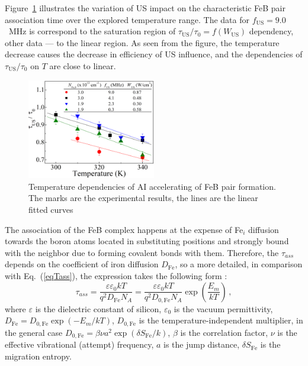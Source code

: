 \documentclass[sn-mathphys]{sn-jnl}%
\theoremstyle{thmstyleone}%
\theoremstyle{thmstyletwo}%
\theoremstyle{thmstylethree}%
\begin{document}
Figure~\ref{figTemp} illustrates the variation of US impact on 
the characteristic FeB pair association time over the explored temperature range.
The data for $f_\mathrm{US}=9.0$~MHz is correspond to the saturation region of 
$\tau_\mathrm{US}/\tau_{0}=f(W_\mathrm{US})$ dependency,
other data --- to the linear region.
As seen from the figure, the temperature decrease causes the decrease in efficiency of US influence,
and the dependencies of $\tau_\mathrm{US}/\tau_{0}$ on $T$ are close to linear.

\begin{figure}
\centering
 \includegraphics[width=0.5\textwidth]{Fig6}
\caption{
Temperature dependencies of AI accelerating of FeB pair formation.
The marks are the experimental results, the lines are the linear fitted curves
}
\label{figTemp}       %
\end{figure}

The association of the FeB complex happens at the expense of  Fe$_i$ diffusion towards the
boron atoms located in substituting positions and strongly bound with the neighbor due to forming covalent bonds with them.
Therefore, the $\tau_{ass}$ depends on the coefficient of iron diffusion $D_\mathrm{Fe}$,
so a more detailed, in comparison with Eq.~(\ref{eqTass}), the expression takes the following form \cite{FeBAssJAP2014,FeBJAP2005,FeBKin2019}:
\begin{equation}
\label{eqTass2}
\tau_{ass}=\frac{\varepsilon\varepsilon_0 kT}{q^2D_\mathrm{Fe}N_A}=
\frac{\varepsilon\varepsilon_0 kT}{q^2D_\mathrm{0,Fe}N_A}\exp\left(\frac{E_m}{kT}\right)\,,
\end{equation}
where
$\varepsilon$ is the dielectric constant of silicon,
$\varepsilon_0$ is the vacuum permittivity,
$D_\mathrm{Fe}=D_\mathrm{0,Fe}\exp(-E_m/kT)$,
$D_\mathrm{0,Fe}$ is the temperature-independent multiplier,
in the general case \cite{AZIZ2001,Stavola,WeberFe}
$D_\mathrm{0,Fe}=\beta\nu a^2\exp(\delta S_\mathrm{Fe}/k)$,
$\beta$ is the correlation factor,
$\nu$  is the effective vibrational (attempt) frequency,
$a$ is the jump distance,
$\delta S_\mathrm{Fe}$ is the migration entropy.
\end{document}
